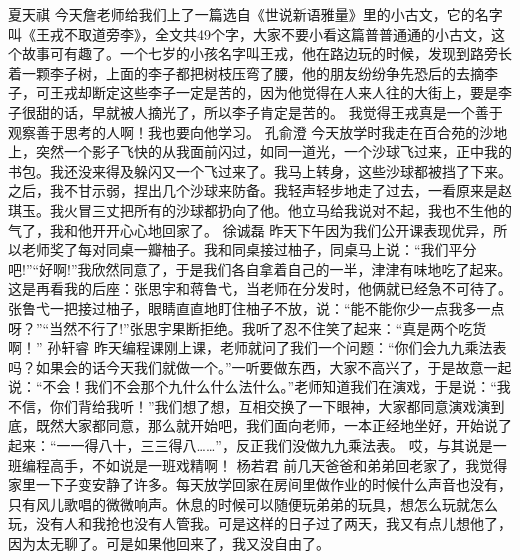 {}\markdownRendererInterblockSeparator
{}夏天祺\markdownRendererInterblockSeparator
{}今天詹老师给我们上了一篇选自《世说新语雅量》里的小古文，它的名字叫《王戎不取道旁李》，全文共49个字，大家不要小看这篇普普通通的小古文，这个故事可有趣了。一个七岁的小孩名字叫王戎，他在路边玩的时候，发现到路旁长着一颗李子树，上面的李子都把树枝压弯了腰，他的朋友纷纷争先恐后的去摘李子，可王戎却断定这些李子一定是苦的，因为他觉得在人来人往的大街上，要是李子很甜的话，早就被人摘光了，所以李子肯定是苦的。\markdownRendererInterblockSeparator
{}我觉得王戎真是一个善于观察善于思考的人啊！我也要向他学习。\markdownRendererInterblockSeparator
{}\markdownRendererInterblockSeparator
{}孔俞澄\markdownRendererInterblockSeparator
{}今天放学时我走在百合苑的沙地上，突然一个影子飞快的从我面前闪过，如同一道光，一个沙球飞过来，正中我的书包。我还没来得及躲闪又一个飞过来了。我马上转身，这些沙球都被挡了下来。之后，我不甘示弱，捏出几个沙球来防备。我轻声轻步地走了过去，一看原来是赵琪玉。我火冒三丈把所有的沙球都扔向了他。他立马给我说对不起，我也不生他的气了，我和他开开心心地回家了。\markdownRendererInterblockSeparator
{}\markdownRendererInterblockSeparator
{}徐诚磊\markdownRendererInterblockSeparator
{}昨天下午因为我们公开课表现优异，所以老师奖了每对同桌一瓣柚子。我和同桌接过柚子，同桌马上说：“我们平分吧!”“好啊!”我欣然同意了，于是我们各自拿着自己的一半，津津有味地吃了起来。这是再看我的后座：张思宇和蒋鲁弋，当老师在分发时，他俩就已经急不可待了。张鲁弋一把接过柚子，眼睛直直地盯住柚子不放，说：“能不能你少一点我多一点呀？”“当然不行了!”张思宇果断拒绝。我听了忍不住笑了起来：“真是两个吃货啊！”\markdownRendererInterblockSeparator
{}\markdownRendererInterblockSeparator
{}孙轩睿\markdownRendererInterblockSeparator
{}昨天编程课刚上课，老师就问了我们一个问题：“你们会九九乘法表吗？如果会的话今天我们就做一个。”一听要做东西，大家不高兴了，于是故意一起说：“不会！我们不会那个九什么什么法什么。”老师知道我们在演戏，于是说：“我不信，你们背给我听！”我们想了想，互相交换了一下眼神，大家都同意演戏演到底，既然大家都同意，那么就开始吧，我们面向老师，一本正经地坐好，开始说了起来：“一一得八十，三三得八……”，反正我们没做九九乘法表。 哎，与其说是一班编程高手，不如说是一班戏精啊！\markdownRendererInterblockSeparator
{}\markdownRendererInterblockSeparator
{}杨若君\markdownRendererInterblockSeparator
{}前几天爸爸和弟弟回老家了，我觉得家里一下子变安静了许多。每天放学回家在房间里做作业的时候什么声音也没有，只有风儿歌唱的微微响声。休息的时候可以随便玩弟弟的玩具，想怎么玩就怎么玩，没有人和我抢也没有人管我。可是这样的日子过了两天，我又有点儿想他了，因为太无聊了。可是如果他回来了，我又没自由了。\markdownRendererInterblockSeparator
